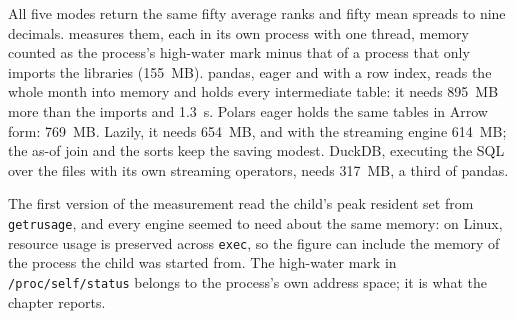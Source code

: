 All five modes return the same fifty average ranks and fifty mean spreads to nine decimals.  measures
them, each in its own process with one thread, memory counted as the process's high-water mark minus that of a process that only imports
the libraries (155~MB). pandas, eager and with a row index, reads the whole month into memory and holds every intermediate table: it
needs 895~MB more than the imports and 1.3~s. Polars eager holds the same tables in Arrow form: 769~MB. Lazily, it needs 654~MB, and
with the streaming engine 614~MB; the as-of join and the sorts keep the saving modest. DuckDB, executing the SQL over the files with its
own streaming operators, needs 317~MB, a third of pandas.

\begin{omfigure}

\label{fig:pl:dataframes:engines}
\end{omfigure}

\begin{remark}\label{rem:pl:dataframes:rss}
The first version of the measurement read the child's peak resident set from \texttt{getrusage}, and every engine seemed to need about
the same memory: on Linux, resource usage is preserved across \texttt{exec}, so the figure can include the memory of the process the child was started
from. The high-water mark in
\texttt{/proc/self/status} belongs to the process's own address space; it is what the chapter reports.
\end{remark}

